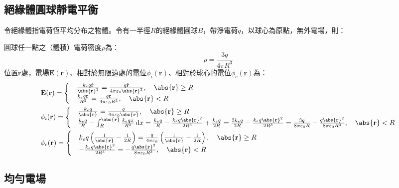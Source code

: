 \documentclass[a4paper,12pt]{report}
\begin{document}
\begin{itemize}
\subsection{絕緣體圓球靜電平衡}
令絕緣體指電荷恆平均分布之物體。令有一半徑$R$的絕緣體圓球$B$，帶淨電荷$q$，以球心為原點，無外電場，則：

圓球任一點之（體積）電荷密度$\rho$為：
\[\rho=\frac{3q}{4\pi R^3}\]
位置$\mathbf{r}$處，電場$\mathbf{E}(\mathbf{r})$、相對於無限遠處的電位$\phi_i(\mathbf{r})$、相對於球心的電位$\phi_c(\mathbf{r})$為：
\[\begin{aligned}
& \mathbf{E}(\mathbf{r})=
\begin{cases}
& \frac{k_eq\hat{\mathbf{r}}}{\abs{\mathbf{r}}^2}=\frac{q\hat{\mathbf{r}}}{4\pi\varepsilon_0\abs{\mathbf{r}}^2},\quad\abs{\mathbf{r}}\geq R\\
& \frac{k_eq\mathbf{r}}{R^3}=\frac{q\mathbf{r}}{4\pi\varepsilon_0 R^3},\quad\abs{\mathbf{r}}<R
\end{cases}\\
& \phi_i(\mathbf{r}) = 
\begin{cases}
& \frac{k_eq}{\abs{\mathbf{r}}}=\frac{q}{4\pi\varepsilon_0\abs{\mathbf{r}}},\quad\abs{\mathbf{r}}\geq R\\
& \frac{k_eq}{R}-\int_R^{\abs{\mathbf{r}}}\frac{k_eqx}{R^3}\,\mathrm{d}x=\frac{k_eq}{R}-\frac{k_eq\abs{\mathbf{r}}^2}{2R^3}+\frac{k_eq}{2R}=\frac{3k_eq}{2R}-\frac{k_eq\abs{\mathbf{r}}^2}{2R^3}=\frac{3q}{8\pi\varepsilon_0 R}-\frac{q\abs{\mathbf{r}}^2}{8\pi\varepsilon_0 R^3},\quad\abs{\mathbf{r}}<R
\end{cases}\\
& \phi_c(\mathbf{r}) = 
\begin{cases}
& k_eq\left(\frac{1}{\abs{\mathbf{r}}}-\frac{1}{2R}\right)=\frac{q}{4\pi\varepsilon_0}\left(\frac{1}{\abs{\mathbf{r}}}-\frac{1}{2R}\right),\quad\abs{\mathbf{r}}\geq R\\
& -\frac{k_eq\abs{\mathbf{r}}^2}{2R^3}=-\frac{q\abs{\mathbf{r}}^2}{8\pi\varepsilon_0 R^3},\quad\abs{\mathbf{r}}<R
\end{cases}
\end{aligned}\]
\subsection{均勻電場}

\end{itemize}
\end{document}
